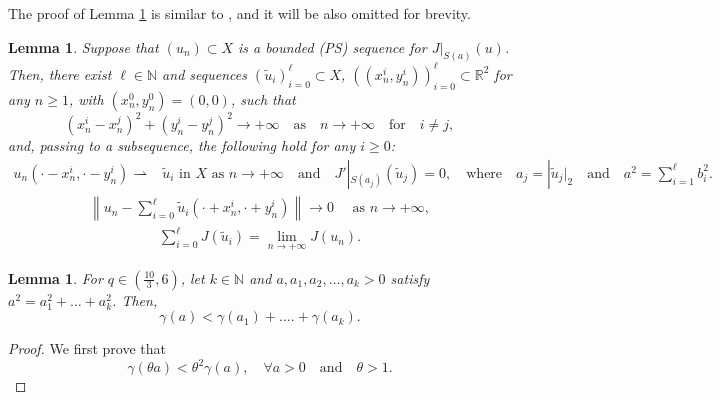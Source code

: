 \documentclass[11pt]{amsart}
\newtheorem{lemma}[theorem]{Lemma}
\numberwithin{equation}{section}
\newcommand\N{\mathbb N}
\begin{document}
{{{The proof of Lemma \ref{profile} is similar to \cite[Lemma 5]{WW}, and it will be also omitted for brevity.
\begin{lemma}\label{profile}
    Suppose that $\left(u_n\right) \subset X$ is a bounded (PS) sequence for $J|_{S(a)}(u)$. Then, there exist $\ell \in \mathbb{N}$ and sequences $\left(\widetilde{u}_i\right)_{i=0}^{\ell} \subset X$, $\left((x_n^i,y_n^i)\right)_{i=0}^{\ell} \subset \mathbb{R}^2$ for any $n \geq 1$, with $(x_n^0,y_n^0)=(0,0)$, such that
    $$
    (x_n^i-x_n^j)^2+(y_n^i-y_n^j)^2 \rightarrow +\infty \quad \text{as} \quad n \rightarrow +\infty \quad \text{for} \quad i \neq j,
    $$
    and, passing to a subsequence, the following hold for any $i \geq 0$:
    \begin{equation}\label{eq:com22}
        \begin{aligned}
            u_n\left(\cdot-x_n^i,\cdot-y_n^i\right) \rightharpoonup& \widetilde{u}_i \text{ in } X \text{ as } n \rightarrow + \infty\quad \text{and} {\quad J'|_{S(a_j)}(\widetilde{u}_j)=0, \quad \mbox{where} \quad a_j=|\widetilde{u}_j|_2 \quad \mbox{and} \quad a^2=\sum_{i=1}^{\ell}b_i^2. }
        \end{aligned}
    \end{equation}
    \begin{equation}\label{eq:com1}
        \begin{aligned}
            \left\|u_n-\sum_{i=0}^{\ell} \widetilde{u}_i\left(\cdot+x_n^i, \cdot+y_n^i\right)\right\| \rightarrow 0 \quad \text { as } n \rightarrow +\infty,
        \end{aligned}
    \end{equation}
    \begin{equation}\label{eq:com3}
        \begin{aligned}
            \sum_{i=0}^{\ell} J\left(\widetilde{u}_i\right)={\lim_{n \rightarrow+ \infty}J({u}_n)}.
        \end{aligned}
    \end{equation}
\end{lemma}
\begin{lemma}\label{subadd}
    For $q\in (\frac{10}{3}, 6)$, let $k \in \N$ and $a, a_1, a_2, \ldots, a_k>0$ satisfy $a^2=a_1^2+\ldots+a_k^2$. Then,
    $$
    \gamma(a)<\gamma\left(a_1\right)+\ldots .+\gamma\left(a_k\right).
    $$
\end{lemma}
\begin{proof}
    We first  prove that
    $$
    \gamma(\theta a)<\theta^2 \gamma(a), \quad \forall a>0 \quad \mbox{and} \quad \theta>1.
$$
\end{proof}}}}
\end{document}
